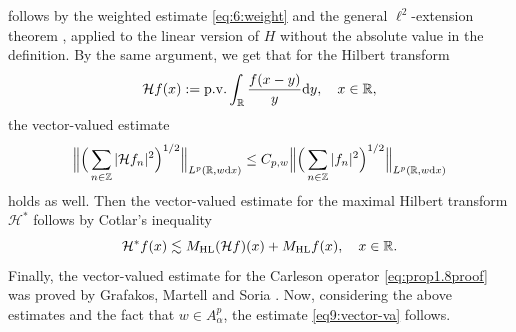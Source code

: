\documentclass[11pt,oneside]{amsart}
\numberwithin{equation}{section}
\theoremstyle{definition}
\newcommand{\RR}{\mathbb{R}}
\newcommand{\ZZ}{\mathbb{Z}}
\newcommand{\calH}{\mathcal{H}}
\begin{document}
follows by the weighted estimate \eqref{eq:6:weight} and the general $\ell^2$-extension theorem \cite[Theorem 5.5.1]{Grafakos}, applied to the linear version of $H$ without the absolute value in the definition. By the same argument, we get that for the Hilbert transform
\begin{equation*}
    \calH f(x):={\rm p.v.}\int_{\RR}\frac{f(x-y)}{y}{\rm d}y,\quad x\in\RR,
\end{equation*}
the vector-valued estimate
\begin{equation*}
\Big\|\Big(\sum_{n\in\ZZ}|\calH f_n|^2\Big)^{1/2}\Big\|_{L^p(\RR,w{\rm d}x)}\leq C_{p,w}\Big\|\Big(\sum_{n\in\ZZ}|f_n|^2\Big)^{1/2}\Big\|_{L^p(\RR,w{\rm d}x)}
\end{equation*}
holds as well. Then the vector-valued estimate for the maximal Hilbert transform $\calH^\ast$ follows by Cotlar's inequality \cite[Theorem 5.3.4]{Grafakos}
\begin{equation*}
    \calH^\ast f(x)\lesssim M_{\rm HL}(\calH f)(x)+ M_{\rm HL}f(x),\quad x\in \RR.
\end{equation*}
Finally, the vector-valued estimate for the Carleson operator \eqref{eq:prop1.8proof} was proved by Grafakos, Martell and Soria \cite{GMS}. Now, considering the above estimates and the fact that $w \in A_\alpha^p$, the estimate \eqref{eq9:vector-va} follows.
\end{document}
